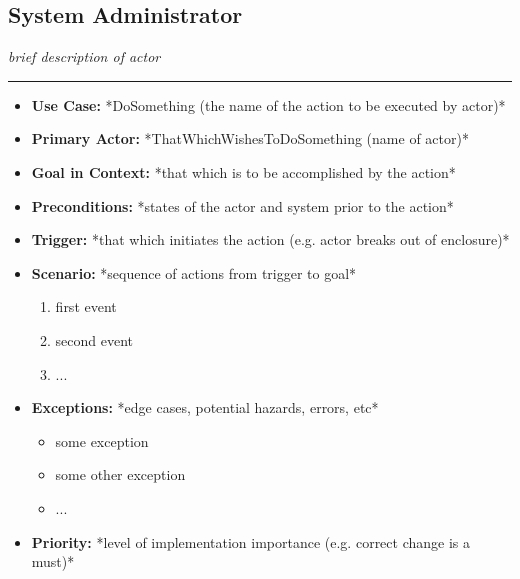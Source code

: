 \documentclass[12pt]{article}
\begin{document}
    \subsection{System Administrator}
    \textit{brief description of actor}
    \par\noindent\rule{\textwidth}{0.4pt}    
    \begin{itemize}
        \item[]\textbf{Use Case:}                                
            *DoSomething (the name of the action to be executed by actor)*

        \item[]\textbf{Primary Actor:}
            *ThatWhichWishesToDoSomething (name of actor)*

        \item[]\textbf{Goal in Context:}
            *that which is to be accomplished by the action*

        \item[]\textbf{Preconditions:}
            *states of the actor and system prior to the action*

        \item[]\textbf{Trigger:}
            *that which initiates the action (e.g. actor breaks out of enclosure)*

        \item[]\textbf{Scenario:}
            *sequence of actions from trigger to goal*
            \begin{enumerate}
                \item first event
                \item second event
                \item ...
            \end{enumerate}

        \item[]\textbf{Exceptions:}
            *edge cases, potential hazards, errors, etc*
            \begin{itemize}
                \item[] some exception
                \item[] some other exception                
                \item[] ...
            \end{itemize}

        \item[]\textbf{Priority:}
            *level of implementation importance (e.g. correct change is a must)*


\end{itemize}
\end{document}
